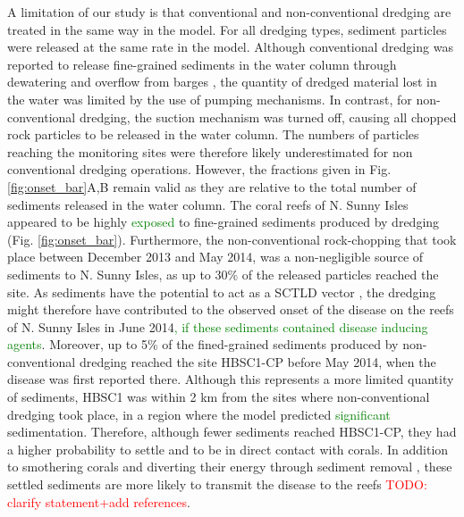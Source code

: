\documentclass[preprint,12pt,authoryear]{elsarticle}
\newcommand{\todo}[1]{\textcolor{red}{TODO: #1}}
\newcommand{\modif}[1]{\textcolor{green}{#1}}
\begin{document}
A limitation of our study is that conventional and non-conventional dredging are treated in the same way in the model. For all dredging types, sediment particles were released at the same rate in the model. Although conventional dredging was reported to release fine-grained sediments in the water column through dewatering and overflow from barges \citep{jones2016assessing}, the quantity of dredged material lost in the water was limited by the use of pumping mechanisms. In contrast, for non-conventional dredging, the suction mechanism was turned off, causing all chopped rock particles to be released in the water column. The numbers of particles reaching the monitoring sites were therefore likely underestimated for non conventional dredging operations. However, the fractions given in Fig. \ref{fig:onset_bar}A,B remain valid as they are relative to the total number of sediments released in the water column. The coral reefs of N. Sunny Isles appeared to be highly \modif{exposed} to fine-grained sediments produced by dredging (Fig. \ref{fig:onset_bar}). Furthermore, the non-conventional rock-chopping that took place between December 2013 and May 2014, was a non-negligible source of sediments to N. Sunny Isles, as up to 30\% of the released particles reached the site. As sediments have the potential to act as a SCTLD vector \citep{rosales2020rhodobacterales, studivan2022reef}, the dredging might therefore have contributed to the observed onset of the disease on the reefs of N. Sunny Isles in June 2014\modif{, if these sediments contained disease inducing agents}. Moreover, up to 5\% of the fined-grained sediments produced by non-conventional dredging reached the site HBSC1-CP before May 2014, when the disease was first reported there. Although this represents a more limited quantity of sediments, HBSC1 was within 2 km from the sites where non-conventional dredging took place, in a region where the model predicted \modif{significant} sedimentation. Therefore, although fewer sediments reached HBSC1-CP, they had a higher probability to settle and to be in direct contact with corals. In addition to smothering corals and diverting their energy through sediment removal \citep{erftemeijer2012environmental}, these settled sediments are more likely to transmit the disease to the reefs \todo{clarify statement+add references}.
\end{document}
